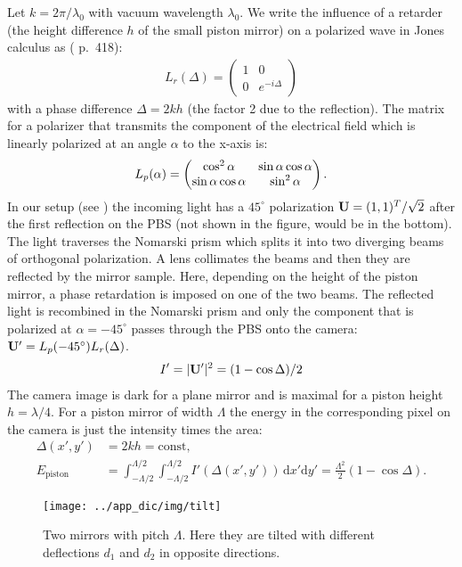 Let $k=2\pi/\lambda_0$ with vacuum wavelength $\lambda_0$. We write
the influence of a retarder (the height difference $h$ of the small
piston mirror) on a polarized wave in Jones calculus as
(\cite{Goodman1996} p.~418):
\begin{align}
L_r(\Delta)=\begin{pmatrix}1&0\\ 0&e^{-i\Delta}\end{pmatrix}
\end{align}
with a phase difference $\Delta=2kh$ (the factor 2 due to the
reflection).  The matrix for a polarizer that transmits the component
of the electrical field which is linearly polarized at an angle
$\alpha$ to the x-axis is:
\begin{align}
L_p(\alpha)=\begin{pmatrix}\cos^2\alpha&\sin\alpha\cos\alpha\cr
  \sin\alpha\cos\alpha&\sin^2\alpha\end{pmatrix}.
\end{align}
In our setup (see ) the incoming light has a
$45^\circ$ polarization $\mathbf{U}=(1,1)^T/\sqrt{2}$ after the first
reflection on the PBS (not shown in the figure, would be in the
bottom). The light traverses the Nomarski prism which splits it into
two diverging beams of orthogonal polarization. A lens collimates the
beams and then they are reflected by the mirror sample. Here,
depending on the height of the piston mirror, a phase retardation is
imposed on one of the two beams. The reflected light is recombined in
the Nomarski prism and only the component that is polarized at
$\alpha=-45^\circ$ passes through the PBS onto the camera: $\mathbf{U}'=L_p(-45^\circ)L_r(\Delta)$.
\begin{align}
  I'=|\mathbf{U}'|^2=(1-\cos\Delta)/2
\end{align}
The camera image is dark for a plane mirror and is maximal for a
piston height $h=\lambda/4$.
For a piston mirror of width $\Lambda$ the energy in the corresponding
pixel on the camera is just the intensity times the area:
\begin{align}
  \Delta(x',y') &=2kh=\textrm{const},\\
  E_\textrm{piston}&=\int_{-\Lambda/2}^{\Lambda/2}\int_{-\Lambda/2}^{\Lambda/2}
  I'(\Delta(x',y'))\,\textrm{d}x'\textrm{d}y'=\frac{\Lambda^2}{2}(1-\cos
  \Delta).
\end{align}
\begin{figure}[ht]
  \centering
  \texttt{[image: ../app\_dic/img/tilt]}
  \caption{ Two mirrors with pitch $\Lambda$. Here they are tilted
    with different deflections $d_1$ and $d_2$ in opposite
    directions.}
  \label{fig:tilt}
\end{figure}
